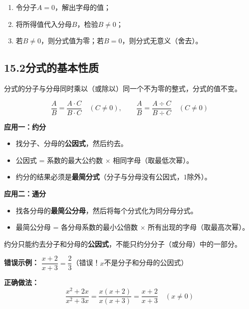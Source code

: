 \documentclass[12pt, a4paper]{ctexart}
\begin{document}
\begin{tipbox}
\begin{enumerate}[leftmargin=2em]
  \item 令分子$A=0$，解出字母的值；
  \item 将所得值代入分母$B$，检验$B \neq 0$；
  \item 若$B \neq 0$，则分式值为零；若$B = 0$，则分式无意义（舍去）。
\end{enumerate}
\end{tipbox}

\subsection*{15.2\quad 分式的基本性质}

\begin{knowledgebox}[分式的基本性质]
分式的分子与分母同时乘以（或除以）同一个不为零的整式，分式的值不变。

\[
\frac{A}{B} = \frac{A \cdot C}{B \cdot C} \quad (C \neq 0), \qquad \frac{A}{B} = \frac{A \div C}{B \div C} \quad (C \neq 0)
\]

\medskip
\textbf{应用一：约分}
\begin{itemize}[leftmargin=2em]
  \item 找分子、分母的\textbf{公因式}，然后约去。
  \item 公因式 = 系数的最大公约数 $\times$ 相同字母（取最低次幂）。
  \item 约分的结果必须是\textbf{最简分式}（分子与分母没有公因式，$1$除外）。
\end{itemize}

\medskip
\textbf{应用二：通分}
\begin{itemize}[leftmargin=2em]
  \item 找各分母的\textbf{最简公分母}，然后将每个分式化为同分母分式。
  \item 最简公分母 = 各分母系数的最小公倍数 $\times$ 所有出现的字母（取最高次幂）。
\end{itemize}
\end{knowledgebox}

\begin{warnbox}
约分只能约去分子和分母的\textbf{公因式}，不能只约分分子（或分母）中的一部分。

\medskip
\textbf{错误示例：} $\dfrac{x+2}{x+3} = \dfrac{2}{3}$\quad（错误！$x$不是分子和分母的公因式）

\medskip
\textbf{正确做法：}
\[
\frac{x^2 + 2x}{x^2 + 3x} = \frac{x(x+2)}{x(x+3)} = \frac{x+2}{x+3} \quad (x \neq 0)
\]
\end{warnbox}
\end{document}
